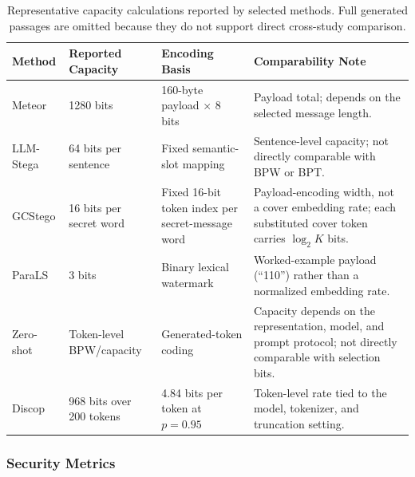 \begin{table}[t]
  \centering
  \footnotesize
  \caption{Representative capacity calculations reported by selected methods. Full generated passages are omitted because they do not support direct cross-study comparison.}
  \label{tab:stego_examples}
  \begin{tabular}{|p{}|p{}|p{}|p{}|}
    \hline
    \textbf{Method} & \textbf{Reported Capacity} & \textbf{Encoding Basis} & \textbf{Comparability Note} \\
    \hline
    Meteor \cite{kaptchuk2021meteor} & 1280 bits & 160-byte payload $\times$ 8 bits & Payload total; depends on the selected message length. \\\hline
    LLM-Stega \cite{wu2024generative} & 64 bits per sentence & Fixed semantic-slot mapping & Sentence-level capacity; not directly comparable with BPW or BPT. \\\hline
    GCStego \cite{li2024imperceptible} & 16 bits per secret word & Fixed 16-bit token index per secret-message word & Payload-encoding width, not a cover embedding rate; each substituted cover token carries $\log_2 K$ bits. \\\hline
    ParaLS \cite{qiang2023natural} & 3 bits & Binary lexical watermark & Worked-example payload (``110'') rather than a normalized embedding rate. \\\hline
    Zero-shot \cite{lin2024zero} & Token-level BPW/capacity & Generated-token coding & Capacity depends on the representation, model, and prompt protocol; not directly comparable with selection bits. \\\hline
    Discop \cite{ding2023discop} & 968 bits over 200 tokens & 4.84 bits per token at $p=0.95$ & Token-level rate tied to the model, tokenizer, and truncation setting. \\
    \hline
  \end{tabular}
\end{table}

\subsubsection{Security Metrics}

